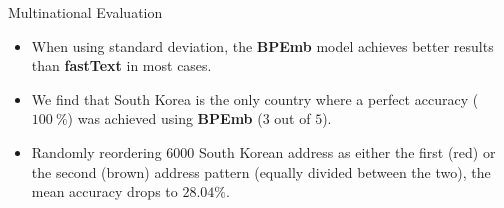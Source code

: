 \documentclass{beamer}
\begin{document}
	\begin{frame}{Multinational Evaluation}
		\begin{itemize}
			\item<1-> When using standard deviation, the \textbf{BPEmb} model achieves better results than \textbf{fastText} in most cases. 
			\item<2-> We find that South Korea is the only country where a perfect accuracy ($100~\%$) was achieved using \textbf{BPEmb} ($3$ out of $5$). 
			\item<3-> Randomly reordering $6000$ South Korean address as either the first (red) or the second (brown) address pattern (equally divided between the two), the mean accuracy drops to $28.04\%$.
		\end{itemize}
	\end{frame}
\end{document}
